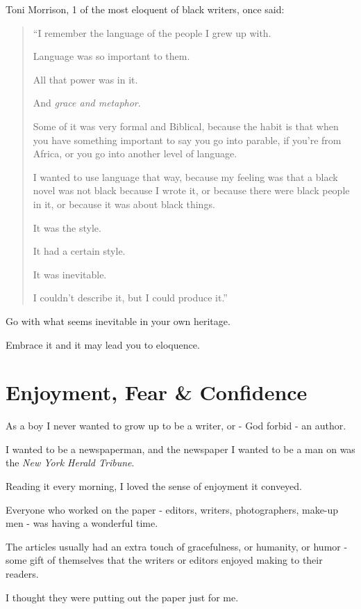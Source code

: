 \documentclass{book}
\numberwithin{equation}{section}
\begin{document}
Toni Morrison, 1 of the most eloquent of black writers, once said:
\begin{quotation}
    ``I remember the language of the people I grew up with.
    
    Language was so important to them.
    
    All that power was in it.
    
    And \textit{grace and metaphor}.
    
    Some of it was very formal and Biblical, because the habit is that when you have something important to say you go into parable, if you're from Africa, or you go into another level of language.
    
    I wanted to use language that way, because my feeling was that a black novel was not black because I wrote it, or because there were black people in it, or because it was about black things.
    
    It was the style.
    
    It had a certain style.
    
    It was inevitable.
    
    I couldn't describe it, but I could produce it.''
\end{quotation}
%
Go with what seems inevitable in your own heritage.

Embrace it and it may lead you to eloquence.


\chapter{Enjoyment, Fear \& Confidence}

As a boy I never wanted to grow up to be a writer, or - God forbid - an author.

I wanted to be a newspaperman, and the newspaper I wanted to be a man on was the \textit{New York Herald Tribune}.

Reading it every morning, I loved the sense of enjoyment it conveyed.

Everyone who worked on the paper - editors, writers, photographers, make-up men - was having a wonderful time.

The articles usually had an extra touch of gracefulness, or humanity, or humor - some gift of themselves that the writers or editors enjoyed making to their readers.

I thought they were putting out the paper just for me.
\end{document}
